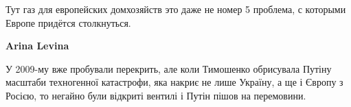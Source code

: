 \begin{itemize}
\begin{itemize}
Тут газ для европейских домхозяйств это даже не номер 5 проблема, с которыми
Европе придётся столкнуться.


\textbf{Arina Levina} 

У 2009-му вже пробували перекрить, але коли Тимошенко обрисувала Путіну
масштаби техногенної катастрофи, яка накриє не лише Україну, а ще і Європу з
Росією, то негайно були відкриті вентилі і Путін пішов на перемовини.

\end{itemize} %


\end{itemize} %
